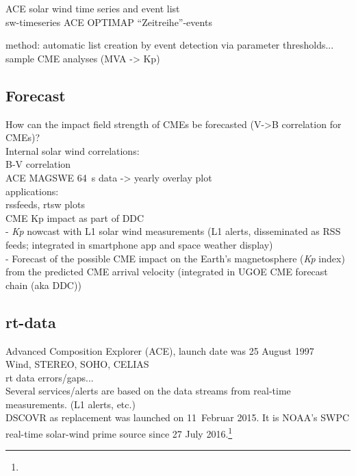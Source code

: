 ACE solar wind time series and event list\\
sw-timeseries ACE OPTIMAP ``Zeitreihe''-events

method: automatic list creation by event detection via parameter thresholds...\\

sample CME analyses (MVA -> Kp)\\


\subsection{Forecast}
How can the impact field strength of CMEs be forecasted (V->B correlation for CMEs)?\\
Internal solar wind correlations:\\
B-V correlation\\
ACE MAGSWE 64~s data -> yearly overlay plot\\

applications:\\
rssfeeds, rtsw plots\\
CME Kp impact as part of DDC\\
- \textit{Kp} nowcast with L1 solar wind measurements (L1 alerts, disseminated as RSS feeds; integrated in smartphone app and space weather display)\\
- Forecast of the possible CME impact on the Earth's magnetosphere (\textit{Kp} index) from the predicted CME arrival velocity (integrated in UGOE CME forecast chain (aka DDC))\\

\subsection{rt-data}
Advanced Composition Explorer (ACE), launch date was 25 August 1997\\
Wind, STEREO, SOHO, CELIAS\\
rt data errors/gaps...\\
Several services/alerts are based on the data streams from real-time measurements. (L1 alerts, etc.)\\
DSCOVR as replacement was launched on 11~Februar 2015. It is NOAA's SWPC real-time solar-wind prime source since 27 July 2016.\footnote{}\\


